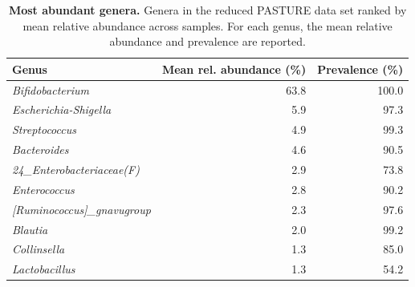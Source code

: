 \begin{table}

\caption{\label{tab:unnamed-chunk-6}\textbf{Most abundant genera.} Genera in the reduced PASTURE data set ranked by mean relative abundance across samples. For each genus, the mean relative abundance and prevalence are reported.}
\centering
\begin{tabular}[t]{lrr}
\toprule
Genus & Mean rel. abundance (\%) & Prevalence (\%)\\
\midrule
\emph{Bifidobacterium} & 63.8 & 100.0\\
\emph{Escherichia-Shigella} & 5.9 & 97.3\\
\emph{Streptococcus} & 4.9 & 99.3\\
\emph{Bacteroides} & 4.6 & 90.5\\
\emph{24_Enterobacteriaceae(F)} & 2.9 & 73.8\\
\addlinespace
\emph{Enterococcus} & 2.8 & 90.2\\
\emph{[Ruminococcus]_gnavugroup} & 2.3 & 97.6\\
\emph{Blautia} & 2.0 & 99.2\\
\emph{Collinsella} & 1.3 & 85.0\\
\emph{Lactobacillus} & 1.3 & 54.2\\
\bottomrule
\end{tabular}
\end{table}
